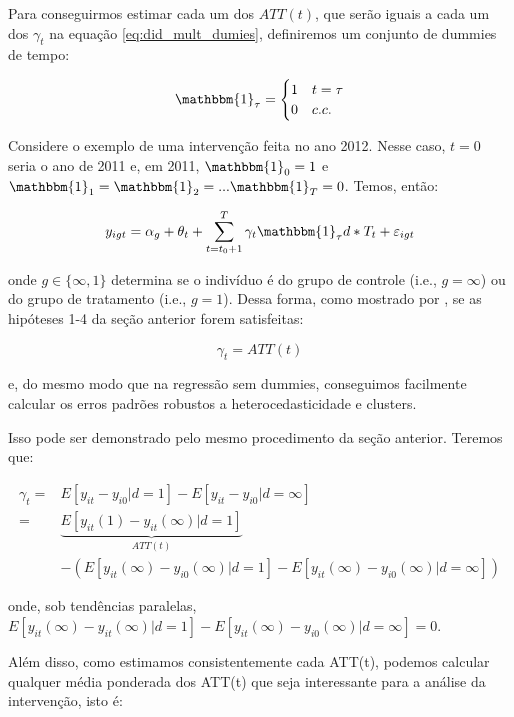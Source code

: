 \documentclass[portugues]{article}
\begin{document}
Para conseguirmos estimar cada um dos $ATT(t)$, que serão iguais a cada um dos  $\gamma_t$ na equação \eqref{eq:did_mult_dumies}, definiremos um conjunto de dummies de tempo:

\[
\begin{split}
    \mathbbm{1}_{\tau} = \begin{cases} 1 & t = \tau \\ 0 & c.c. \end{cases}
\end{split}
\]

\noindent Considere o exemplo de uma intervenção feita no ano 2012. Nesse caso, $t=0$ seria o ano de 2011 e, em 2011, $\mathbbm{1}_{0} = 1$ e $\mathbbm{1}_{1} = \mathbbm{1}_{2} = ... \mathbbm{1}_{T} = 0$. Temos, então:

\begin{equation}\label{eq:did_mult_dumies}
    y_{igt} = \alpha_g + \theta_t + \sum_{t=t_0+1}^{T} \gamma_t  \mathbbm{1}_{\tau} d * T_t + \varepsilon_{igt} 
\end{equation}

\noindent onde $g \in \{\infty,1\}$ determina se o indivíduo é do grupo de controle (i.e., $g= \infty$) ou do grupo de tratamento (i.e., $g=1$). Dessa forma, como mostrado por \cite{angrist2009mostly}, se as hipóteses 1-4 da seção anterior forem satisfeitas:

$$ \gamma_t = ATT(t)$$

\noindent e, do mesmo modo que na regressão sem dummies, conseguimos facilmente calcular os erros padrões robustos a heterocedasticidade e clusters.

Isso pode ser demonstrado pelo mesmo procedimento da seção anterior. Teremos que:

\[
\begin{split}
   \gamma_t =& E[y_{it} - y_{i0}|d=1] - E[y_{it} - y_{i0}|d=\infty] \\
                    =&\underbrace{E[y_{it}(1) - y_{it}(\infty)|d=1]}_{ATT(t)} \\
                    &- ( E[y_{it}(\infty) - y_{i0}(\infty)|d=1] - E[y_{it}(\infty) - y_{i0}(\infty)|d=\infty])
\end{split}
\]

\noindent onde, sob tendências paralelas, $E[y_{it}(\infty) - y_{it}(\infty)|d=1] - E[y_{it}(\infty) - y_{i0}(\infty)|d=\infty] = 0$.

Além disso, como estimamos consistentemente cada ATT(t), podemos calcular qualquer média ponderada dos ATT(t) que seja interessante para a análise da intervenção, isto é:
\end{document}
